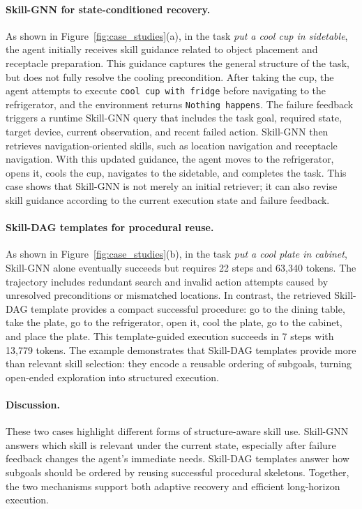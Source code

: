 \documentclass[letterpaper]{article}
\begin{document}
\paragraph{Skill-GNN for state-conditioned recovery.}
As shown in Figure~\ref{fig:case_studies}(a), in the task
\textit{put a cool cup in sidetable}, the agent initially receives skill
guidance related to object placement and receptacle preparation. This guidance
captures the general structure of the task, but does not fully resolve the
cooling precondition. After taking the cup, the agent attempts to execute
\texttt{cool cup with fridge} before navigating to the refrigerator, and the
environment returns \texttt{Nothing happens}. The failure feedback triggers a
runtime Skill-GNN query that includes the task goal, required state, target
device, current observation, and recent failed action. Skill-GNN then retrieves
navigation-oriented skills, such as location navigation and receptacle
navigation. With this updated guidance, the agent moves to the refrigerator,
opens it, cools the cup, navigates to the sidetable, and completes the task.
This case shows that Skill-GNN is not merely an initial retriever; it can also
revise skill guidance according to the current execution state and failure
feedback.

\paragraph{Skill-DAG templates for procedural reuse.}
As shown in Figure~\ref{fig:case_studies}(b), in the task
\textit{put a cool plate in cabinet}, Skill-GNN alone eventually succeeds but
requires 22 steps and 63,340 tokens. The trajectory includes redundant search
and invalid action attempts caused by unresolved preconditions or mismatched
locations. In contrast, the retrieved Skill-DAG template provides a compact
successful procedure: go to the dining table, take the plate, go to the
refrigerator, open it, cool the plate, go to the cabinet, and place the plate.
This template-guided execution succeeds in 7 steps with 13,779 tokens. The
example demonstrates that Skill-DAG templates provide more than relevant skill
selection: they encode a reusable ordering of subgoals, turning open-ended
exploration into structured execution.

\paragraph{Discussion.}
These two cases highlight different forms of structure-aware skill use.
Skill-GNN answers which skill is relevant under the current state, especially
after failure feedback changes the agent's immediate needs. Skill-DAG templates
answer how subgoals should be ordered by reusing successful procedural
skeletons. Together, the two mechanisms support both adaptive recovery and
efficient long-horizon execution.




\end{document}
